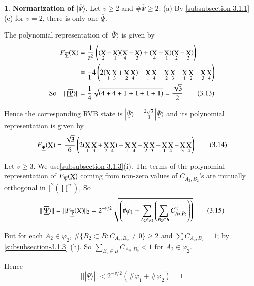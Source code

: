 \documentclass[a4paper,12pt]{article}
\DeclareMathOperator{\x}{\mathrm{X}}
\theoremstyle{definition}
\theoremstyle{underlinethm}
\theoremstyle{definition}
\newtheorem{subsubsec}{}[subsection]
\begin{document}
\begin{subsubsec}\label{subsubsection-3.1.4}
{\bf Normarization of $| \underline{\overline{\Psi}} \rangle$}. Let $v \geq 2$ and $\# \underline{\overline{\Psi}} \geq 2 $. (a) By \ref{subsubsection-3.1.1} (e) for $v=2$, there is only one $\underline{\overline{\Psi}}$. 

The polynomial representation of $| \underline{\overline{\Psi}} \rangle$ is given by
\begin{align*}
F_{\underline{\overline{\Psi}}} (\bold{\x}) &= \frac{1}{z^{2}}\left((\x_{2} - \x_{1}) (\x_{4} - \x_{3}) + (\x_{4}-\x_{1}) (\x_{2}-\x_{3})\right)\\
 &= \frac{}1{4} \left(2(\x_{1} \x_{3} + \x_{2} \x_{4}) - \x_{1} \x_{4}- \x_{2}\x_{3} -\x_{1}\x_{2}-\x_{3}\x_{4}\right)\\
\text{So} \quad || | \underline{\overline{\Psi}} \rangle || &= \frac{1}{4} \sqrt{\left(4+4+1+1+1+1\right)} = \frac{\sqrt{3}}{2}\tag{3.13}
\end{align*}

Hence the corresponding RVB state is $| \underline{\overline{\Psi}} \rangle  = \frac{2\sqrt{3}}{3} | \underline{\overline{\Psi}} \rangle$ and its polynomial representation is given by 
\begin{equation*}
F_{\underline{\overline{\Psi}}}(\bold{\x}) = \frac{\sqrt{3}}{6} \left(2(\x_{1}\x_{3} + \x_{2}\x_{4}) - \x_{1}\x_{4} - \x_{2}\x_{3}- \x_{1}\x_{4} -\x_{3}\x_{4}\right)\tag{3.14}
\end{equation*}

Let $v\geq 3$. We use\ref{subsubsection-3.1.3}(i). The terms of the polynomial representation of $F_{\underline{\overline{\Psi}}}(\bold{\x})$ coming from non-zero values of $C_{A_{2}, B_{2}}$'s are mutually orthogonal in $\lfloor^{2}\left(\prod^{n}\right)$, So
\begin{equation*}
|| | \underline{\overline{\Psi}} \rangle || = ||F_{\underline{\overline{\Psi}}}(\bold{\x})||_{2} = 2^{-v/2}\sqrt{\left(\# \varphi_{1}  + \sum_{A_{2} \in \varphi_{2}} \left(\sum_{B_{2} \subset B} C_{A_{2}, B_{2}}^{2}\right) \right)}\tag{3.15}
\end{equation*}

But for each $A_{2} \in \varphi_{2}$, $\# \{B_{2} \subset B  : C_{A_{2}, B_{2}} \neq 0\} \geq 2$ and $\sum C_{A_{2}, B_{2}} = 1$; by \ref{subsubsection-3.1.3} (h). So $\sum_{B_{2} \in B} C_{A_{2}, B_{2}} < 1$ for $A_{2} \in \varphi_{2}$.

Hence
\begin{equation*}
|| | \underline{\overline{\Psi}} \rangle || < 2^{-v/2} (\# \varphi_{1} + \# \varphi_{2}) =1\tag{3.16}
\end{equation*}


\end{subsubsec}
\end{document}
